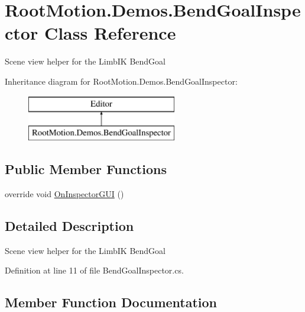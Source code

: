 \hypertarget{class_root_motion_1_1_demos_1_1_bend_goal_inspector}{}\section{Root\+Motion.\+Demos.\+Bend\+Goal\+Inspector Class Reference}
\label{class_root_motion_1_1_demos_1_1_bend_goal_inspector}


Scene view helper for the Limb\+IK Bend\+Goal  


Inheritance diagram for Root\+Motion.\+Demos.\+Bend\+Goal\+Inspector\+:\begin{figure}[H]
\begin{center}
\leavevmode
\includegraphics[height=2.000000cm]{class_root_motion_1_1_demos_1_1_bend_goal_inspector}
\end{center}
\end{figure}
\subsection*{Public Member Functions}
\begin{DoxyCompactItemize}
\item 
override void \mbox{\hyperlink{class_root_motion_1_1_demos_1_1_bend_goal_inspector_ae53c074c0ec91adf1003e8628268cf61}{On\+Inspector\+G\+UI}} ()
\end{DoxyCompactItemize}


\subsection{Detailed Description}
Scene view helper for the Limb\+IK Bend\+Goal 



Definition at line 11 of file Bend\+Goal\+Inspector.\+cs.



\subsection{Member Function Documentation}
\mbox{\label{class_root_motion_1_1_demos_1_1_bend_goal_inspector_ae53c074c0ec91adf1003e8628268cf61}} 
